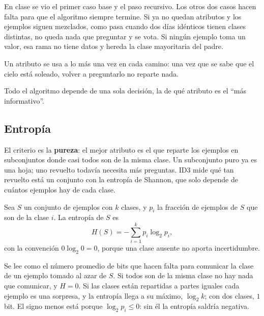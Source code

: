 \documentclass[11pt,letterpaper]{article}
\begin{document}
En clase se vio el primer caso base y el paso recursivo. Los otros dos
casos hacen falta para que el algoritmo siempre termine. Si ya no
quedan atributos y los ejemplos siguen mezclados, como pasa cuando dos
días idénticos tienen clases distintas, no queda nada que preguntar y
se vota. Si ningún ejemplo toma un valor, esa rama no tiene datos y
hereda la clase mayoritaria del padre.

Un atributo se usa a lo más una vez en cada camino: una vez que se
sabe que el cielo está soleado, volver a preguntarlo no reparte nada.

Todo el algoritmo depende de una sola decisión, la de qué atributo es
el ``más informativo''.


\subsection*{Entropía}

El criterio es la \textbf{pureza}: el mejor atributo es el que reparte
los ejemplos en subconjuntos donde casi todos son de la misma clase. Un
subconjunto puro ya es una hoja; uno revuelto todavía necesita más
preguntas. ID3 mide qué tan revuelto está un conjunto con la entropía
de Shannon, que solo depende de cuántos ejemplos hay de cada clase.

\begin{definicion}[Entropía]
    Sea $S$ un conjunto de ejemplos con $k$ clases, y $p_i$ la fracción
    de ejemplos de $S$ que son de la clase $i$. La entropía de $S$ es
    \[
        H(S) = -\sum_{i=1}^{k} p_i \log_2 p_i ,
    \]
    con la convención $0 \log_2 0 = 0$, porque una clase ausente no
    aporta incertidumbre.
\end{definicion}

Se lee como el número promedio de bits que hacen falta para comunicar
la clase de un ejemplo tomado al azar de $S$. Si todos son de la misma
clase no hay nada que comunicar, y $H = 0$. Si las clases están
repartidas a partes iguales cada ejemplo es una sorpresa, y la
entropía llega a su máximo, $\log_2 k$; con dos clases, $1$ bit. El
signo menos está porque $\log_2 p_i \le 0$: sin él la entropía saldría
negativa.
\end{document}
